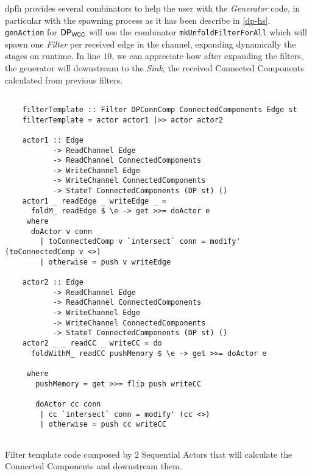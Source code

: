 \acrshort{dpfh} provides several combinators to help the user with the \textit{Generator} code, in particular with the spawning process as it has been describe in \autoref{dp-hs}.
\texttt{genAction} for $\mathsf{DP_{WCC}}$ will use the combinator \texttt{mkUnfoldFilterForAll} which will spawn one \textit{Filter} per received edge in the channel, expanding dynamically the stages on runtime.
In line $10$, we can appreciate how after expanding the filters, the generator will downstream to the \textit{Sink}, the received Connected Components calculated from previous filters.

\begin{listing}[H]
 \scriptsize{
  \begin{verbatim}
    
    filterTemplate :: Filter DPConnComp ConnectedComponents Edge st
    filterTemplate = actor actor1 |>> actor actor2
    
    actor1 :: Edge
           -> ReadChannel Edge
           -> ReadChannel ConnectedComponents
           -> WriteChannel Edge
           -> WriteChannel ConnectedComponents
           -> StateT ConnectedComponents (DP st) ()
    actor1 _ readEdge _ writeEdge _ = 
      foldM_ readEdge $ \e -> get >>= doActor e
     where
      doActor v conn
        | toConnectedComp v `intersect` conn = modify' (toConnectedComp v <>)
        | otherwise = push v writeEdge
    
    actor2 :: Edge
           -> ReadChannel Edge
           -> ReadChannel ConnectedComponents
           -> WriteChannel Edge
           -> WriteChannel ConnectedComponents
           -> StateT ConnectedComponents (DP st) ()
    actor2 _ _ readCC _ writeCC = do 
      foldWithM_ readCC pushMemory $ \e -> get >>= doActor e
    
     where
       pushMemory = get >>= flip push writeCC
    
       doActor cc conn
        | cc `intersect` conn = modify' (cc <>)
        | otherwise = push cc writeCC
    
  \end{verbatim}
  }
  \caption[{[\texttt{ConnectedComp.hs}] Filter Template Code}]{Filter template code composed by 2 Sequential Actors that will calculate the Connected Components and downstream them.}
  \label{src:dpwcc:4}
\end{listing}

